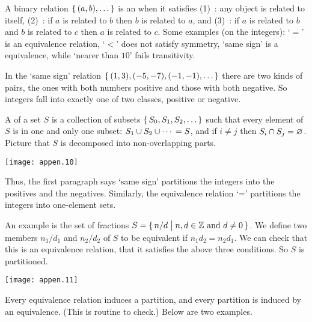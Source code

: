 A binary relation \( \mbox{$\{\,(a,b),\ldots \,\}$} \)
is an 
when it satisfies
(1)~: 
     any object is related to itself,
(2)~: 
     if \( a \) is related to \( b \) then
     \( b \) is related to \( a \), and
(3)~:
     if \( a \) is related to \( b \) and \( b \) is
     related to \( c \) then \( a \) is related to \( c \).
Some examples (on the integers): `\( = \)' is an equivalence relation,
`\( < \)' does not satisfy symmetry,
`same sign' is a equivalence, while `nearer than \( 10 \)' fails transitivity.






In the `same sign' relation \( \mbox{$\{\, (1,3),(-5,-7),(-1,-1),\ldots\,\}$} \)
there are two kinds of pairs, the ones with both numbers positive
and those with both negative.
So integers fall into exactly one of two classes, positive or negative.

A  
of a set \( S \) is a collection of subsets
\( \mbox{$\{\,S_0,S_1,S_2,\ldots\,\}$} \) such that
every element of \( S \) is in one and only one subset:
\( S_1\cup S_2\cup \cdots{} = S \), and
if \( i\neq j \) then
\( S_i\cap S_j=\varnothing \).
Picture that \( S \) is decomposed into non-overlapping parts.
\begin{center}
  \texttt{[image: appen.10]}
\end{center}
Thus, the first paragraph says `same sign' partitions
the integers into the positives and the negatives.
Similarly, the equivalence relation `=' partitions the integers into
one-element sets.

An example is the set of fractions 
$S=\mbox{$\{\,n/d\bigm| \text{$n,d\in\mathbb{Z}$ and $d\neq 0$}\,\}$}$.
We define two members $n_1/d_1$ and $n_2/d_2$ of $S$ 
to be equivalent if $n_1d_2=n_2d_1$.
We can check that this is an equivalence relation, that
it satisfies the above three conditions.
So $S$ is partitioned.
\begin{center}
  \texttt{[image: appen.11]}
\end{center}

Every equivalence relation induces a partition, and every 
partition is induced by an equivalence.
(This is routine to check.)
Below are two examples.
 
